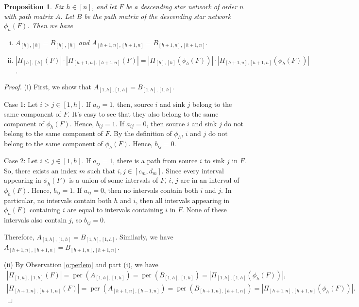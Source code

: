 \documentclass[12pt]{amsart}
\newtheorem{prop}[thm]{Proposition}
\theoremstyle{definition}
\numberwithin{equation}{section}
\DeclareMathOperator{\perm}{per}
\begin{document}
\begin{prop}\label{p: star network contraction}
  Fix $h \in [n]$, and let $F$ be a descending star network of order $n$
  with path matrix $A$.
  Let $B$ be the path matrix of the descending star network
  $\phi_h(F)$. Then we have
  \begin{enumerate}[(i)]
  \setlength{\itemsep}{0.7em}
  \item $A_{[h],[h]} = B_{[h],[h]}$ and
    $A_{[h+1,n],[h+1,n]} = B_{[h+1,n],[h+1,n]}$.

  \item $|\Pi_{[h],[h]}(F)|\cdot|\Pi_{[h+1,n],[h+1,n]}(F)| = |\Pi_{[h],[h]}(\phi_h(F))|\cdot|\Pi_{[h+1,n],[h+1,n]}(\phi_h(F))|$.
  \end{enumerate}
\end{prop}
\begin{proof}
(i) First, we show that $A_{[1,h],[1,h]} = B_{[1,h],[1,h]}$.

  Case 1: Let $i > j \in [1,h]$. If $a_{ij} =1$, then, source $i$ and sink $j$ belong to the same component of $F$. It's easy to see that they also belong to the same component of $\phi_h(F)$. Hence, $b_{ij} = 1$. If $a_{ij} = 0$, then source $i$ and sink $j$ do not belong to the same component of $F$. By the definition of $\phi_h$, $i$ and $j$ do not belong to the same component of $\phi_h(F)$. Hence, $b_{ij} = 0$.

  Case 2: Let $i \leq j \in [1,h]$. If $a_{ij} = 1$, there is a path from source $i$ to sink $j$ in $F$. So, there exists an index $m$ such that $i,j\in [c_m,d_m]$. Since every interval appearing in $\phi_h(F)$ is a union of some intervals of $F$, $i$, $j$ are in an interval of $\phi_h(F)$. Hence, $b_{ij} = 1$. If $a_{ij} = 0$, then no intervals contain both $i$ and $j$. In particular, no intervals contain both $h$ and $i$, then all intervals appearing in $\phi_h(F)$ containing $i$ are equal to intervals containing $i$ in $F$. None of these intervals also contain $j$, so $b_{ij} = 0$.

  Therefore, $A_{[1,h],[1,h]} = B_{[1,h],[1,h]}$. Similarly, we have $A_{[h+1,n],[h+1,n]} = B_{[h+1,n],[h+1,n]}$.

 \noindent
  (ii) By Observation \ref{o:perlem} and part (i), we have \begin{gather*}
  |\Pi_{[1,h],[1,h]}(F)| = \perm(A_{[1,h],[1,h]})=\perm(B_{[1,h],[1,h]})=|\Pi_{[1,h],[1,h]}(\phi_h(F))|,\\
|\Pi_{[h+1,n],[h+1,n]}(F)| = \perm(A_{[h+1,n],[h+1,n]})=\perm(B_{[h+1,n],[h+1,n]})=|\Pi_{[h+1,n],[h+1,n]}(\phi_h(F))|.
\end{gather*}  \end{proof}
\end{document}
